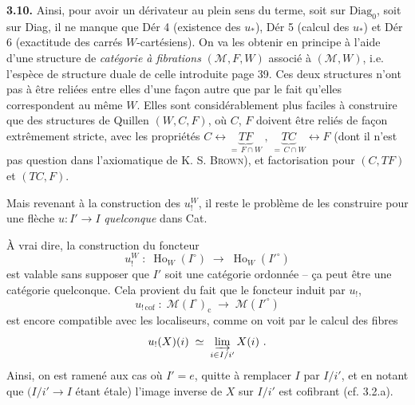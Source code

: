 \documentclass[11pt]{article}
\newcommand{\msp}[1]{\marginpar{\footnotesize [#1]}}
\newcommand{\Ho}{\operatorname{Ho}}
\newcommand{\M}{\mathcal{M}}
\begin{document}
\msp{page 65}
\textbf{3.10.} Ainsi, pour avoir un dérivateur au plein sens du terme, soit sur $\mathrm{Diag}_0$, soit sur Diag, il ne manque que Dér 4 (existence des $u_*$), Dér 5 (calcul des $u_*$) et Dér 6 (exactitude des carrés $W$-cartésiens). On va les obtenir en principe à l'aide d'une structure de \textit{catégorie à fibrations} $(\M,F,W)$ associé à $(\M,W)$, i.e. l'espèce de structure duale de celle introduite %
page 39. Ces deux structures n'ont pas à être reliées entre elles d'une façon autre que par le fait qu'elles correspondent au même $W$. Elles sont considérablement plus faciles à construire que des structures de Quillen $(W,C,F)$, où $C$, $F$ doivent être reliés de façon extrêmement stricte, avec les propriétés $C \longleftrightarrow \underbrace{TF}_{=\,F\cap W}\ ,\ \underbrace{TC}_{=\,C\cap W} \longleftrightarrow F$ (dont il n'est pas question dans l'axiomatique de K. S. \textsc{Brown}), et factorisation pour $(C,TF)$ et $(TC,F)$.

\msp{page 66}
Mais revenant à la construction des $u_!^W$, il reste le problème de les construire pour une flèche $u : I'\longrightarrow I$ \textit{quelconque} dans Cat. %

À vrai dire, la construction du foncteur
\[
u_!^W \;:\; \Ho_W(I^\circ) \;\longrightarrow\; \Ho_W(I'^\circ) \tag*{(3.3.1)}
\]
est valable sans supposer que $I'$ soit une catégorie ordonnée – ça peut être une catégorie quelconque. Cela provient du fait que le foncteur induit par $u_!$,
\[
u_{!\,\mathrm{cof}} \;:\; \M(I^\circ)_{\mathrm{c}} \;\longrightarrow\; \M(I'^\circ)
\]
est encore compatible avec les localiseurs, comme on voit par le calcul des fibres
\[
u_!(X)(i) \;\simeq\; \varinjlim_{i\in I/i'} X(i)\ . %
\]
Ainsi, on est ramené aux cas où $I' = e$, quitte à remplacer $I$ par $I/i'$, et en notant que %
$(I/i'\longrightarrow I$ étant étale) l'image inverse de $X$ sur $I/i'$ est cofibrant (cf. 3.2.a). %
\end{document}

